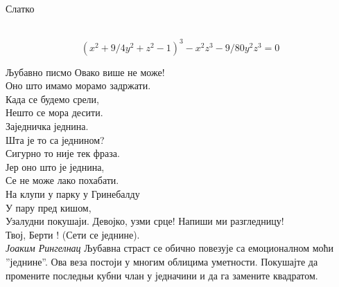 \documentclass[sr]{./../../common/SurferDesc}%
\begin{document}
\footnotesize


\begin{surferPage}
  \begin{surferTitle}Слатко\end{surferTitle}   \\

\smallskip
\[(x^2+ 9/4y^2	+ z^2- 1)^3- x^2z^3	- 9/80y^2z^3	= 0\]

\singlespacing
Љубавно писмо
\singlespacing
Овако више не може!\\
Оно што имамо морамо задржати.\\
Када се будемо срели,\\
Нешто се мора десити.\\
Заједничка једнина.\\
Шта је то са једнином?\\
Сигурно то није тек фраза.\\
Јер оно што је једнина,\\
Се не може лако похабати.\\
На клупи у парку у Гринебалду\\
У пару пред кишом,\\
Узалудни покушаји. Девојко, узми срце! Напиши ми разгледницу!\\
Твој, Берти ! (Сети се једнине).\\
{\it Јоаким Рингелнац}
\singlespacing 
Љубавна страст се обично повезује са емоционалном моћи ''једнине''. Ова веза постоји у многим облицима уметности.
\singlespacing 
Покушајте да промените последњи кубни члан у једначини и да га замените квадратом.



  \begin{surferText}
     \end{surferText}
\end{surferPage}
\end{document}
